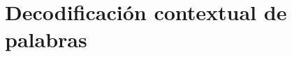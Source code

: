 \documentclass[11pt,spanish,listoffigures,listoftables]{tfgetsinf}
\begin{document}





\section{Decodificación contextual de palabras}
\end{document}
